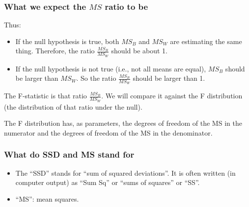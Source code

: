 \documentclass[bigger]{beamer}
\begin{document}
\begin{frame}
  \frametitle{What we expect the $MS$ ratio to be}
  Thus:
    \begin{itemize}
    \item If the null hypothesis is true, both $MS_B$ and $MS_W$ are estimating
      the same thing. Therefore, the ratio $\frac{MS_B}{MS_W}$ should be about 1.
    \item If the null hypothesis is not true (i.e., not all means are equal),
      $MS_B$ should be larger than $MS_W$. So the ratio $\frac{MS_B}{MS_W}$
      should be larger than 1.
    \end{itemize}

    The F-statistic is that ratio  $\frac{MS_B}{MS_W}$. We will compare it
    against the F distribution (the distribution of that ratio under the null).


    \vspace*{10pt}

    {\scriptsize The F distribution
    has, as parameters, the degrees of freedom of the MS in the numerator and the
    degrees of freedom of the MS in the denominator.}
\end{frame}



\begin{frame}
  \frametitle{What do SSD and MS stand for}
  \begin{itemize}
  \item The ``SSD'' stands for ``sum of squared deviations''. It is often written
    (in computer output) as ``Sum Sq'' or ``sums of squares'' or ``SS''.
  \item ``MS'': mean squares.
  \end{itemize}
\end{frame}
\end{document}
